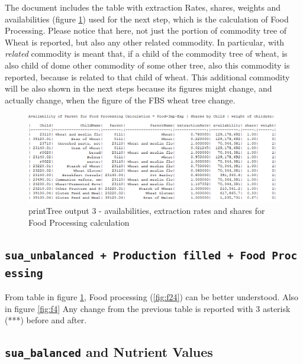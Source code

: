 \documentclass[]{article}
\begin{document}
The document includes the table with extraction Rates, shares, weights
and availabilities (figure \ref{fig:f3}) used for the next step, which
is the calculation of Food Processing. Please notice that here, not just
the portion of commodity tree of Wheat is reported, but also any other
related commodity. In particular, with \emph{related} commodity is meant
that, if a child of the commodity tree of wheat, is also child of dome
other commodity of some other tree, also this commodity is reported,
because is related to that child of wheat. This additional commodity
will be also shown in the next steps because its figures might change,
and actually change, when the figure of the FBS wheat tree change.

\begin{figure}[H]

{\centering \includegraphics[width=0.9\linewidth]{images/printTree/03_availabilities} 

}

\caption{\label{fig:f3}printTree output 3 - availabilities, extraction rates and shares for Food Processing calculation}\label{fig:f3}
\end{figure}

\subsection{\texorpdfstring{\texttt{sua\_unbalanced\ +\ Production\ filled\ +\ Food\ Processing}}{sua\_unbalanced + Production filled + Food Processing}}\label{sua_unbalanced-production-filled-food-processing}

From table in figure \ref{fig:f3}, Food processing (\ref{fig:f24}) can
be better understood. Also in figure \ref{fig:f4} Any change from the
previous table is reported with 3 asterisk (***) before and after.

\subsection{\texorpdfstring{\texttt{sua\_balanced} and Nutrient
Values}{sua\_balanced and Nutrient Values}}\label{sua_balanced-and-nutrient-values}
\end{document}
